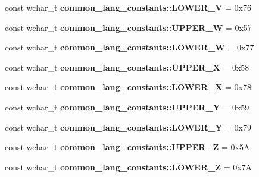 \begin{DoxyCompactItemize}
\item 
\hypertarget{group___indexing_gadbc065fe65fa45b48fd189bf6c0a79a0}{const wchar\-\_\-t {\bfseries common\-\_\-lang\-\_\-constants\-::\-L\-O\-W\-E\-R\-\_\-\-V} = 0x76}\label{group___indexing_gadbc065fe65fa45b48fd189bf6c0a79a0}

\item 
\hypertarget{group___indexing_ga931cd0048a52dd6170fb20400fad163b}{const wchar\-\_\-t {\bfseries common\-\_\-lang\-\_\-constants\-::\-U\-P\-P\-E\-R\-\_\-\-W} = 0x57}\label{group___indexing_ga931cd0048a52dd6170fb20400fad163b}

\item 
\hypertarget{group___indexing_ga3c012af3f360725580eb2fa586d0b001}{const wchar\-\_\-t {\bfseries common\-\_\-lang\-\_\-constants\-::\-L\-O\-W\-E\-R\-\_\-\-W} = 0x77}\label{group___indexing_ga3c012af3f360725580eb2fa586d0b001}

\item 
\hypertarget{group___indexing_ga613d3ce9f22d020b3ca751bb4ed3a9ff}{const wchar\-\_\-t {\bfseries common\-\_\-lang\-\_\-constants\-::\-U\-P\-P\-E\-R\-\_\-\-X} = 0x58}\label{group___indexing_ga613d3ce9f22d020b3ca751bb4ed3a9ff}

\item 
\hypertarget{group___indexing_ga4bf9cd193941ad22a0c442121e869767}{const wchar\-\_\-t {\bfseries common\-\_\-lang\-\_\-constants\-::\-L\-O\-W\-E\-R\-\_\-\-X} = 0x78}\label{group___indexing_ga4bf9cd193941ad22a0c442121e869767}

\item 
\hypertarget{group___indexing_ga4a625f5707841bcbecdca659d822576a}{const wchar\-\_\-t {\bfseries common\-\_\-lang\-\_\-constants\-::\-U\-P\-P\-E\-R\-\_\-\-Y} = 0x59}\label{group___indexing_ga4a625f5707841bcbecdca659d822576a}

\item 
\hypertarget{group___indexing_ga135cc5a13bd6b2e17b149e3122abece3}{const wchar\-\_\-t {\bfseries common\-\_\-lang\-\_\-constants\-::\-L\-O\-W\-E\-R\-\_\-\-Y} = 0x79}\label{group___indexing_ga135cc5a13bd6b2e17b149e3122abece3}

\item 
\hypertarget{group___indexing_ga7f65a4297b3a337dd4c8953e9adcfff7}{const wchar\-\_\-t {\bfseries common\-\_\-lang\-\_\-constants\-::\-U\-P\-P\-E\-R\-\_\-\-Z} = 0x5\-A}\label{group___indexing_ga7f65a4297b3a337dd4c8953e9adcfff7}

\item 
\hypertarget{group___indexing_gad5509b4116c36508f2c1fa92cf88706b}{const wchar\-\_\-t {\bfseries common\-\_\-lang\-\_\-constants\-::\-L\-O\-W\-E\-R\-\_\-\-Z} = 0x7\-A}\label{group___indexing_gad5509b4116c36508f2c1fa92cf88706b}


\end{DoxyCompactItemize}
